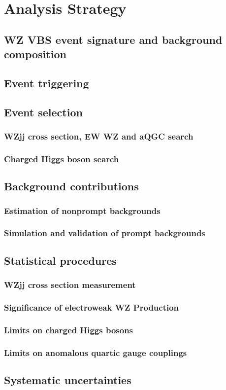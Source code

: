 \chapter{Analysis Strategy}

\section{WZ VBS event signature and background composition}
\section{Event triggering}
\section{Event selection}
\subsection{WZjj cross section, EW WZ and aQGC search}
\subsection{Charged Higgs boson search}
\section{Background contributions}
\subsection{Estimation of nonprompt backgrounds}
\subsection{Simulation and validation of prompt backgrounds}
\section{Statistical procedures}
\subsection{WZjj cross section measurement}
\subsection{Significance of electroweak WZ Production}
\subsection{Limits on charged Higgs bosons}
\subsection{Limits on anomalous quartic gauge couplings}
\section{Systematic uncertainties}
